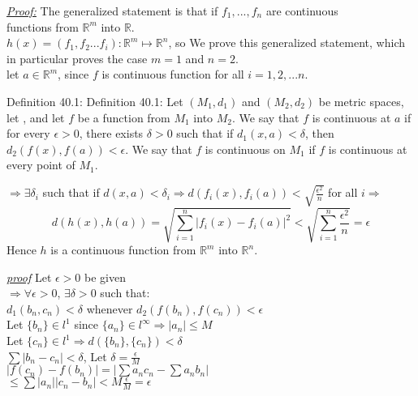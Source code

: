 \documentclass{book}
\begin{document}
\begin{tcolorbox}[enhanced,attach boxed title to top center={yshift=-3mm,yshifttext=-1mm},
colback=blue!5!white,colframe=blue!75!black,colbacktitle=red!80!black,
title=Exercise 40.8:,fonttitle=\bfseries,
boxed title style={size=small,colframe=red!50!black} ]
\textit{\color{blue}\underline{Proof:}}
The generalized statement is that if $f_1,..., f_n$ are continuous\\ functions from $\mathbb{R}^m$ into 
$\mathbb{R}$.\\
$h(x)=(f_1,f_2...f_i):\mathbb{R}^m\longmapsto\mathbb{R}^n$, so We prove this generalized statement, which in 
particular proves the case $m=1$ and $n=2$.\\
let $a\in\mathbb{R}^m$, since $f$ is continuous function for all $i=1,2,...n$.
\begin{tcolorbox}[colback=red!5!white,colframe=red!75!black]
{\color{red}Definition 40.1:}
Definition 40.1: Let $(M_1,d_1)$ and $(M_2,d_2)$ be metric spaces, let , and let $f$ be a function from $M_1$ 
into $M_2$. We say that $f$ is continuous at 
$a$ if for every $\epsilon>0$, there exists $\delta>0$ such that if $d_1(x, a)<\delta$, then 
$d_2(f(x),f(a))<\epsilon$. We say that $f$ is continuous on 
$M_1$ if $f$ is continuous at every point of $M_1$.
\end{tcolorbox}
$\Longrightarrow\exists\delta_i$ such that if $d(x,a)<\delta_i\Rightarrow 
d(f_i(x),f_i(a))<\sqrt{\frac{\epsilon^2}{n}}$ for all $i\Longrightarrow$
$$d(h(x),h(a))=\sqrt{\sum_{i=1}^{n}|f_i(x)-f_i(a)|^2}<\sqrt{\sum_{i=1}^{n}\frac{\epsilon^2}{n}}=\epsilon$$
Hence $h$ is a continuous function from $\mathbb{R}^m$ into $\mathbb{R}^n$.
\end{tcolorbox}
\begin{tcolorbox}[enhanced,attach boxed title to top center={yshift=-3mm,yshifttext=-1mm},
colback=blue!5!white,colframe=blue!75!black,colbacktitle=red!80!black,
title=Exercise 40.10:,fonttitle=\bfseries,
boxed title style={size=small,colframe=red!50!black} ]
\textit{\color{blue}\underline{proof}}
Let $\epsilon >0$ be given\\
$\Rightarrow \forall \epsilon>0$, $\exists \delta>0$ such that:\\
$d_1 (b_n,c_n)<\delta$ whenever $d_2 (f(b_n),f(c_n))<\epsilon$\\
Let $\{b_n\}\in l^1$ since $\{a_n\}\in l^\infty\Rightarrow |a_n|\leq M$\\
Let $\{c_n\}\in l^1\Rightarrow d(\{b_n\},\{c_n\})<\delta$\\
$\sum|b_n-c_n|<\delta$, Let $\delta=\frac{\epsilon}{M}$\\
$|f(c_n)-f(b_n)|=|\sum a_n c_n-\sum a_n b_n|$\\
$\leq\sum |a_n||c_n-b_n|<M\frac{\epsilon}{M}=\epsilon$
\end{tcolorbox}
\end{document}
